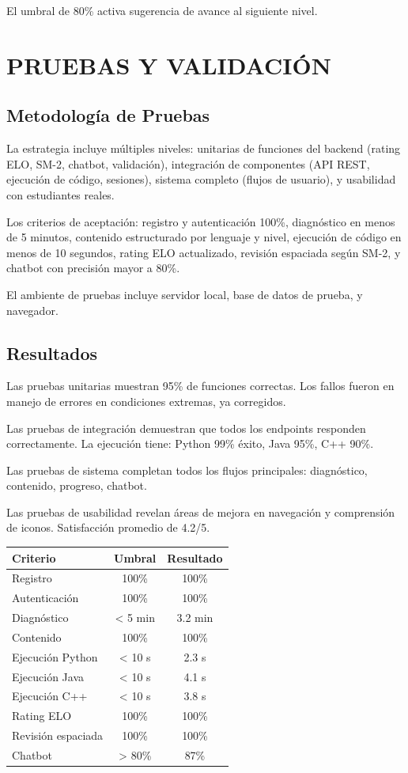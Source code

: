 \documentclass[12pt,letterpaper]{article}
\begin{document}
El umbral de 80\% activa sugerencia de avance al siguiente nivel.

\section{PRUEBAS Y VALIDACIÓN}

\subsection{Metodología de Pruebas}

La estrategia incluye múltiples niveles: unitarias de funciones del backend (rating ELO, SM-2, chatbot, validación), integración de componentes (API REST, ejecución de código, sesiones), sistema completo (flujos de usuario), y usabilidad con estudiantes reales.

Los criterios de aceptación: registro y autenticación 100\%, diagnóstico en menos de 5 minutos, contenido estructurado por lenguaje y nivel, ejecución de código en menos de 10 segundos, rating ELO actualizado, revisión espaciada según SM-2, y chatbot con precisión mayor a 80\%.

El ambiente de pruebas incluye servidor local, base de datos de prueba, y navegador.

\subsection{Resultados}

Las pruebas unitarias muestran 95\% de funciones correctas. Los fallos fueron en manejo de errores en condiciones extremas, ya corregidos.

Las pruebas de integración demuestran que todos los endpoints responden correctamente. La ejecución tiene: Python 99\% éxito, Java 95\%, C++ 90\%.

Las pruebas de sistema completan todos los flujos principales: diagnóstico, contenido, progreso, chatbot.

Las pruebas de usabilidad revelan áreas de mejora en navegación y comprensión de iconos. Satisfacción promedio de 4.2/5.

\begin{table}[ht]
\centering
\begin{tabular}{|l|c|c|}
\hline
\textbf{Criterio} & \textbf{Umbral} & \textbf{Resultado} \\
\hline
Registro & 100\% & 100\% \\
Autenticación & 100\% & 100\% \\
Diagnóstico & < 5 min & 3.2 min \\
Contenido & 100\% & 100\% \\
Ejecución Python & < 10 s & 2.3 s \\
Ejecución Java & < 10 s & 4.1 s \\
Ejecución C++ & < 10 s & 3.8 s \\
Rating ELO & 100\% & 100\% \\
Revisión espaciada & 100\% & 100\% \\
Chatbot & > 80\% & 87\% \\
\hline
\end{tabular}
\end{table}
\end{document}
